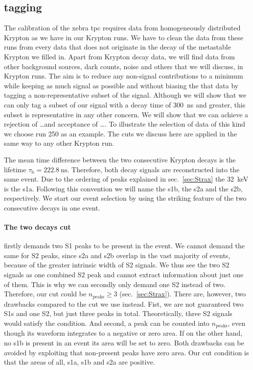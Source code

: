
\FloatBarrier
\subsection{tagging}
\label{ssec:tagging}
\FloatBarrier



The calibration of the \gls{xebra} \gls{tpc} requires data from homogeneously distributed Krypton as we have in our Krypton runs.
We have to clean the data from these runs from every data that does not originate in the decay of the metastable Krypton we filled in.
Apart from Krypton decay data, we will find data from other background sources, dark counts, noise and others that we will discuss, in Krypton runs.
The aim is to reduce any non-signal contributions to a minimum while keeping as much signal as possible and without biasing the that data by tagging a non-representative subset of the signal.
Although we will show that we can only tag a subset of our signal with a decay time of \SI{300}{\nano\s} and greater, this subset is representative in any other concern.
We will show that we can achieve a rejection of \dots and acceptance of \dots.  %
To illustrate the selection of data of this kind we choose run 250 as an example.
The cuts we discuss here are applied in the same way to any other Krypton run.


The mean time difference between the two consecutive Krypton decays is the lifetime $\tau_\mathrm{b} = \SI{222.8}{\nano\s}$.
Therefore, both decay signals are reconstructed into the same event.
Due to the ordering of peaks explained in sec.~\ref{sec:Strax} the \SI{32}{\kilo\eV} is the \gls{s1a}.
Following this convention we will name the \gls{s1b}, the \gls{s2a} and the \gls{s2b}, respectively.
We start our event selection by using the striking feature of the two consecutive decays in one event.


\paragraph{The two decays cut} firstly demands two S1 peaks to be present in the event.
We cannot demand the same for S2 peaks, since \gls{s2a} and \gls{s2b} overlap in the vast majority of events, because of the greater intrinsic width of S2 signals.
We thus see the two S2 signals as one combined S2 peak and cannot extract information about just one of them.
This is why we can secondly only demand one S2 instead of two.
Therefore, our cut could be $n_\mathrm{peaks} \ge 3$ (sec.~\ref{sec:Strax}).
There are, however, two drawbacks compared to the cut we use instead.
Fist, we are not guaranteed two S1s and one S2, but just three peaks in total.
Theoretically, three S2 signals would satisfy the condition.
And second, a peak can be counted into $ n_\mathrm{peaks} $, even though its waveform integrates to a negative or zero area.
If on the other hand, no \gls{s1b} is present in an event its area will be set to zero.
Both drawbacks can be avoided by exploiting that non-present peaks have zero area.
Our cut condition is that the areas of all, \gls{s1a}, \gls{s1b} and \gls{s2a} are positive.

